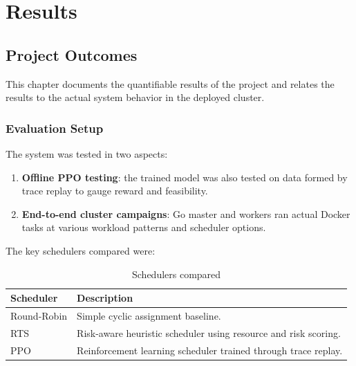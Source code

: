 %
%
%

\chapter{Results}
\label{section:results}

\section{Project Outcomes}
\label{section:proj_outcomes}

This chapter documents the quantifiable results of the project and relates the results to the actual system behavior in the deployed cluster.

\subsection{Evaluation Setup}

The system was tested in two aspects:

\begin{enumerate}
    \item \textbf{Offline PPO testing}: the trained model was also tested on data formed by trace replay to gauge reward and feasibility.
    \item \textbf{End-to-end cluster campaigns}: Go master and workers ran actual Docker tasks at various workload patterns and scheduler options.
\end{enumerate}

The key schedulers compared were:

\begin{table}[H]
\centering
\caption{Schedulers compared}
\label{tab:schedulers}
\begin{tabularx}{\textwidth}{lX}
\toprule
\textbf{Scheduler} & \textbf{Description} \\
\midrule
Round-Robin & Simple cyclic assignment baseline. \\
RTS & Risk-aware heuristic scheduler using resource and risk scoring. \\
PPO & Reinforcement learning scheduler trained through trace replay. \\
\bottomrule
\end{tabularx}
\end{table}

